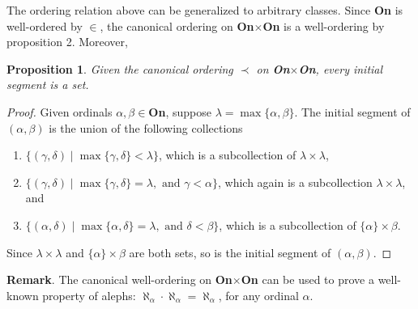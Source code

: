 \documentclass[12pt]{article}
\newtheorem{prop}{Proposition}
\begin{document}
The ordering relation above can be generalized to arbitrary classes.  Since \textbf{On} is well-ordered by $\in$, the canonical ordering on \textbf{On}$\times$\textbf{On} is a well-ordering by proposition 2.  Moreover, 
\begin{prop} Given the canonical ordering $\prec$ on \textbf{On}$\times$\textbf{On}, every initial segment is a set. \end{prop}
\begin{proof}  Given ordinals $\alpha, \beta\in $\textbf{On}, suppose $\lambda = \max\lbrace \alpha,\beta\rbrace$.  The initial segment of $(\alpha,\beta)$ is the union of the following collections 
\begin{enumerate}
\item $\lbrace (\gamma,\delta)\mid \max\lbrace \gamma,\delta\rbrace < \lambda \rbrace$, which is a subcollection of $\lambda \times \lambda$, 
\item $\lbrace (\gamma,\delta) \mid \max\lbrace \gamma,\delta\rbrace = \lambda, \mbox{ and }\gamma < \alpha \rbrace$, which again is a subcollection $\lambda\times \lambda$, and 
\item $\lbrace (\alpha,\delta) \mid \max\lbrace \alpha,\delta \rbrace = \lambda, \mbox{ and }\delta < \beta \rbrace$, which is a subcollection of $\lbrace \alpha \rbrace \times \beta $.
\end{enumerate}
Since $\lambda\times \lambda$ and $\lbrace \alpha \rbrace \times \beta $ are both sets, so is the initial segment of $(\alpha,\beta)$.
\end{proof}

\textbf{Remark}.  The canonical well-ordering on \textbf{On}$\times$\textbf{On} can be used to prove a well-known property of alephs: $\aleph_{\alpha} \cdot \aleph_{\alpha} = \aleph_{\alpha}$, for any ordinal $\alpha$.
\end{document}
